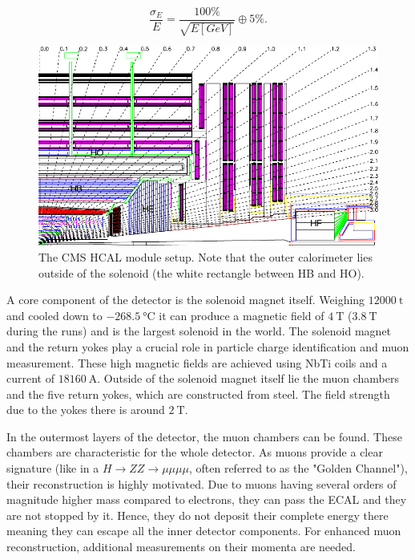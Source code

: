 \begin{equation*}
	\frac{\sigma_E}{E} = \frac{100\%}{\sqrt{E\left[GeV\right]}} \oplus 5\%.
\end{equation*}

\begin{figure}[h!]
	\centering
	\includegraphics[width=0.8\linewidth]{figures/experiment/hcal.pdf}
	\caption{The CMS HCAL module setup. Note that the outer calorimeter lies outside of the solenoid (the white rectangle between HB and HO). \cite{Chatrchyan:1129810}}
	\label{fig:hcal}
\end{figure}


A core component of the detector is the solenoid magnet itself. Weighing $\SI{12000}{\tonne}$ and cooled down to $\SI{-268.5}{\degreeCelsius}$ it can produce a magnetic field of $\SI{4}{\tesla}$ ($\SI{3.8}{\tesla}$ during the runs) and is the largest solenoid in the world. The solenoid magnet and the return yokes play a crucial role in particle charge identification and muon measurement. These high magnetic fields are achieved using NbTi coils and a current of $\SI{18160}{\ampere}$. Outside of the solenoid magnet itself lie the muon chambers and the five return yokes, which are constructed from steel. The field strength due to the yokes there is around $\SI{2}{\tesla}$.


In the outermost layers of the detector, the muon chambers can be found. These chambers are characteristic for the whole detector. As muons provide a clear signature (like in a $H \rightarrow ZZ \rightarrow \mu\mu\mu\mu$, often referred to as the "Golden Channel"), their reconstruction is highly motivated. Due to muons having several orders of magnitude higher mass compared to electrons, they can pass the ECAL and they are not stopped by it.  Hence, they do not deposit their complete energy there meaning they can escape all the inner detector components. For enhanced muon reconstruction, additional measurements on their momenta are needed.

